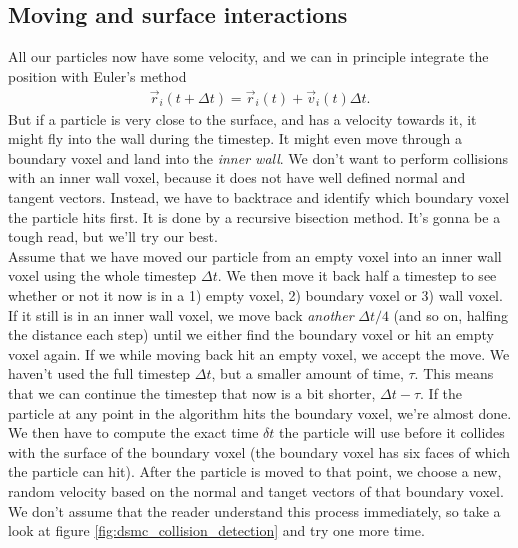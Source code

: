 \subsection{Moving and surface interactions}
All our particles now have some velocity, and we can in principle integrate the position with Euler's method
\begin{align}
	\vec r_i(t + \Delta t) = \vec r_i(t) + \vec v_i(t)\Delta t.
\end{align}
But if a particle is very close to the surface, and has a velocity towards it, it might fly into the wall during the timestep. It might even move through a boundary voxel and land into the \textit{inner wall}. We don't want to perform collisions with an inner wall voxel, because it does not have well defined normal and tangent vectors. Instead, we have to backtrace and identify which boundary voxel the particle hits first. It is done by a recursive bisection method. It's gonna be a tough read, but we'll try our best.\\
Assume that we have moved our particle from an empty voxel into an inner wall voxel using the whole timestep $\Delta t$. We then move it back half a timestep to see whether or not it now is in a 1) empty voxel, 2) boundary voxel or 3) wall voxel. If it still is in an inner wall voxel, we move back \textit{another} $\Delta t/4$ (and so on, halfing the distance each step) until we either find the boundary voxel or hit an empty voxel again. If we while moving back hit an empty voxel, we accept the move. We haven't used the full timestep $\Delta t$, but a smaller amount of time, $\tau$. This means that we can continue the timestep that now is a bit shorter, $\Delta t - \tau$. If the particle at any point in the algorithm hits the boundary voxel, we're almost done. We then have to compute the exact time $\delta t$ the particle will use before it collides with the surface of the boundary voxel (the boundary voxel has six faces of which the particle can hit). After the particle is moved to that point, we choose a new, random velocity based on the normal and tanget vectors of that boundary voxel.\\
We don't assume that the reader understand this process immediately, so take a look at figure \ref{fig:dsmc_collision_detection} and try one more time.
